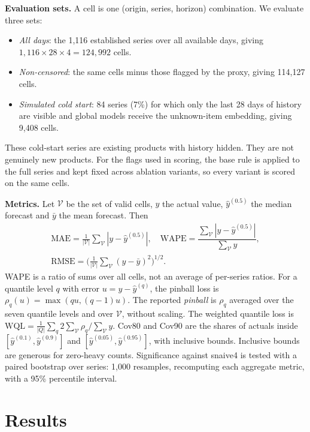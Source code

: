 \documentclass[conference]{IEEEtran}
\newcommand{\WAPE}{\mathrm{WAPE}}
\begin{document}
\textbf{Evaluation sets.} A cell is one (origin, series, horizon) combination. We evaluate three sets:
\begin{itemize}
\item \emph{All days}: the 1,116 established series over all available days, giving $1{,}116\times28\times4=124{,}992$ cells.
\item \emph{Non-censored}: the same cells minus those flagged by the proxy, giving 114,127 cells.
\item \emph{Simulated cold start}: 84 series (7\%) for which only the last 28 days of history are visible and global models receive the unknown-item embedding, giving 9,408 cells.
\end{itemize}
These cold-start series are existing products with history hidden. They are not genuinely new products. For the flags used in scoring, the base rule is applied to the full series and kept fixed across ablation variants, so every variant is scored on the same cells.

\textbf{Metrics.} Let $\mathcal V$ be the set of valid cells, $y$ the actual value, $\hat y^{(0.5)}$ the median forecast and $\bar y$ the mean forecast. Then
\begin{gather}
\mathrm{MAE}=\tfrac{1}{|\mathcal V|}\textstyle\sum_{\mathcal V}|y-\hat y^{(0.5)}|,\quad
\WAPE=\dfrac{\sum_{\mathcal V}|y-\hat y^{(0.5)}|}{\sum_{\mathcal V}y},\\
\mathrm{RMSE}=\Big(\tfrac{1}{|\mathcal V|}\textstyle\sum_{\mathcal V}(y-\bar y)^2\Big)^{1/2}.
\end{gather}
WAPE is a ratio of sums over all cells, not an average of per-series ratios. For a quantile level $q$ with error $u=y-\hat y^{(q)}$, the pinball loss is $\rho_q(u)=\max(qu,(q-1)u)$. The reported \emph{pinball} is $\rho_q$ averaged over the seven quantile levels and over $\mathcal V$, without scaling. The weighted quantile loss is $\mathrm{WQL}=\tfrac{1}{|Q|}\sum_q 2\sum_{\mathcal V}\rho_q/\sum_{\mathcal V}y$. Cov80 and Cov90 are the shares of actuals inside $[\hat y^{(0.1)},\hat y^{(0.9)}]$ and $[\hat y^{(0.05)},\hat y^{(0.95)}]$, with inclusive bounds. Inclusive bounds are generous for zero-heavy counts. Significance against \textsf{snaive4} is tested with a paired bootstrap over series: 1,000 resamples, recomputing each aggregate metric, with a 95\% percentile interval.

\section{Results}\label{sec:results}
\end{document}
